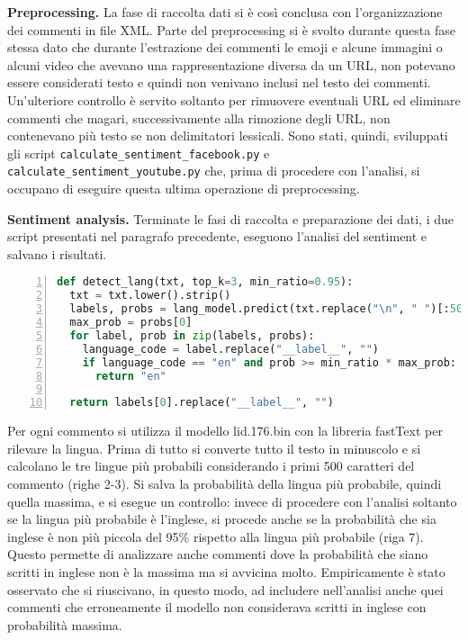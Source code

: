 \documentclass[conference]{IEEEtran}
\newcommand{\mypar}[1]{{\bf #1.}}
\begin{document}
\mypar{Preprocessing} La fase di raccolta dati si è così conclusa con l'organizzazione dei commenti in file XML. Parte del preprocessing
si è svolto durante questa fase stessa dato che durante l'estrazione dei commenti le emoji e alcune immagini o alcuni video
che avevano una rappresentazione diversa da un URL, non potevano essere considerati testo e quindi non venivano inclusi nel
testo dei commenti. Un'ulteriore controllo è servito soltanto per rimuovere eventuali URL ed eliminare commenti
che magari, successivamente alla rimozione degli URL, non contenevano più testo se non delimitatori lessicali. Sono stati, quindi, sviluppati
gli script \texttt{calculate\_sentiment\_facebook.py} e \texttt{calculate\_sentiment\_youtube.py} che, prima di procedere con l'analisi, si
occupano di eseguire questa ultima operazione di preprocessing.

\mypar{Sentiment analysis} Terminate le fasi di raccolta e preparazione dei dati, i due script presentati nel paragrafo
precedente, eseguono l'analisi del sentiment e salvano i risultati.

\begin{lstlisting}[language=Python, numbers=left, numberstyle=\tiny]
def detect_lang(txt, top_k=3, min_ratio=0.95):
  txt = txt.lower().strip()
  labels, probs = lang_model.predict(txt.replace("\n", " ")[:500], k=top_k)
  max_prob = probs[0]
  for label, prob in zip(labels, probs):
    language_code = label.replace("__label__", "")
    if language_code == "en" and prob >= min_ratio * max_prob:
      return "en"
  
  return labels[0].replace("__label__", "")
\end{lstlisting}

Per ogni commento si utilizza il modello lid.176.bin con la libreria fastText per rilevare la lingua. Prima di tutto
si converte tutto il testo in minuscolo e si calcolano le tre lingue più probabili considerando i primi 500 caratteri
del commento (righe 2-3). Si salva la probabilità della lingua più probabile, quindi quella massima, e si esegue un controllo:
invece di procedere con l'analisi soltanto se la lingua più probabile è l'inglese, si procede anche se la probabilità che
sia inglese è non più piccola del 95\% rispetto alla lingua più probabile (riga 7). Questo permette di analizzare anche commenti
dove la probabilità che siano scritti in inglese non è la massima ma si avvicina molto. Empiricamente è stato osservato che si
riuscivano, in questo modo, ad includere nell'analisi anche quei commenti che erroneamente il modello non considerava scritti in
inglese con probabilità massima.
\end{document}
